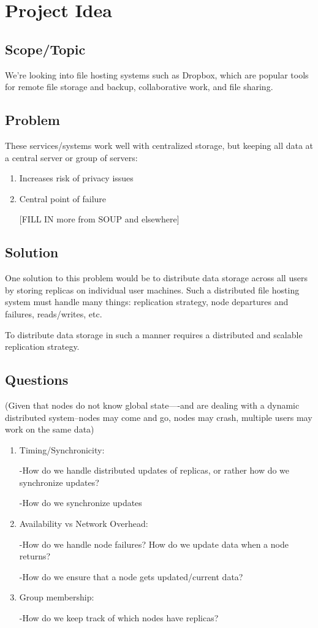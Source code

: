 \section{Project Idea}
\subsection{Scope/Topic} 
We're looking into file hosting systems such as Dropbox, which are popular tools for remote file storage and backup, collaborative work, and file sharing.
\subsection{Problem} 
These services/systems work well with centralized storage, but keeping all data at a central server or group of servers:
\begin{enumerate}
\item Increases risk of privacy issues
\item Central point of failure

[FILL IN more from SOUP and elsewhere]
\end{enumerate}
\subsection{Solution}
One solution to this problem would be to distribute data storage across all users by storing replicas on individual user machines.
Such a distributed file hosting system must handle many things: replication strategy, node departures and failures, reads/writes, etc.

To distribute data storage in such a manner requires a distributed and scalable replication strategy.

\subsection{Questions}
(Given that nodes do not know global state----and are dealing with a dynamic distributed system--nodes may come and go, nodes may crash, multiple users may work on the same data)
\begin{enumerate}
\item Timing/Synchronicity:

-How do we handle distributed updates of replicas, or rather how do we synchronize updates?

-How do we synchronize updates

\item Availability vs Network Overhead:

-How do we handle node failures?  How do we update data when a node returns?

-How do we ensure that a node gets updated/current data?

\item Group membership:

-How do we keep track of which nodes have replicas?
\end{enumerate}

